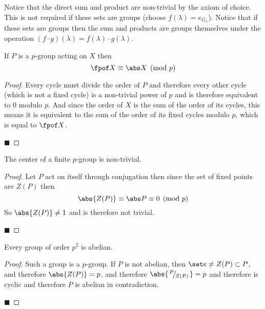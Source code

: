 \documentclass[10pt]{article}
\def\slfrac#1#2{\left.{}^{#1}\mkern-4mu\middle/\mkern-3mu{}_{#2}\right.}
\begin{document}
Notice that the direct sum and product are non-trivial by the axiom of choice.
This is not required if these sets are groups (choose $f(\lambda)=e_{G_\lambda}$).
Notice that if these sets are groups then the sum and products are groups themselves under the operation $(f\cdot g)(\lambda)=f(\lambda)\cdot g(\lambda)$.

\begin{prop*}

    If $P$ is a $p$-group acting on $X$ then
    \[ \fpof X\equiv \abs X\pmod p \]

\end{prop*}

\begin{proof}

    Every cycle must divide the order of $P$ and therefore every other cycle (which is not a fixed cycle) is a non-trivial power of $p$ and is therefore equivalent to $0$ modulo $p$.
    And since the order of $X$ is the sum of the order of its cycles, this means it is equivalent to the sum of the order of its fixed cycles modulo $p$, which is equal to $\fpof X$.

    \hfill$\blacksquare$

\end{proof}

\begin{prop*}

    The center of a finite $p$-group is non-trivial.

\end{prop*}

\begin{proof}

    Let $P$ act on itself through conjugation then since the set of fixed points are $Z(P)$ then
    \[ \abs{Z(P)}\equiv\abs P\equiv 0\pmod p \]
    So $\abs{Z(P)}\neq1$ and is therefore not trivial.

    \hfill$\blacksquare$

\end{proof}

\begin{prop*}

    Every group of order $p^2$ is abelian.

\end{prop*}

\begin{proof}

    Such a group is a $p$-group.
    If $P$ is not abelian, then $\set e\neq Z(P)\subset P$, and therefore $\abs{Z(P)}=p$, and therefore $\abs{\slfrac{P}{Z(P)}}=p$ and therefore is cyclic and therefore $P$ is abelian in contradiction.

    \hfill$\blacksquare$

\end{proof}
\end{document}
